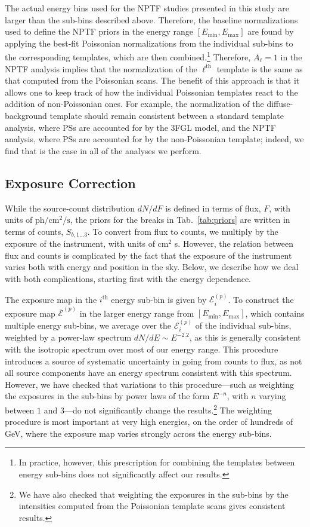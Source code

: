 The actual energy bins used for the NPTF studies presented in this study are larger than the sub-bins described above.  Therefore, the baseline normalizations used to define the NPTF priors in the energy range $[E_\text{min}, E_\text{max}]$ are found by applying the best-fit Poissonian normalizations from the individual sub-bins to the corresponding templates, which are then combined.\footnote{In practice, however, this prescription for combining the templates between energy sub-bins does not significantly affect our results.  
}
  Therefore, $A_\ell = 1$ in the NPTF analysis implies that the normalization of the $\ell^\text{th}$ template is the same as that computed from the Poissonian scans.  The benefit of this approach is that it allows one to keep track of how the individual Poissonian templates react to the addition of non-Poissonian ones.  For example, the normalization of the diffuse-background template should remain consistent between a standard template analysis, where PSs are accounted for by the 3FGL model, and the NPTF analysis, where PSs are accounted for by the non-Poissonian template; indeed, we find that is the case in all of the analyses we perform. 
  
\subsection{Exposure Correction}  
  
While the source-count distribution $dN/dF$ is defined in terms of flux, $F$, with units of $\text{ph}/\text{cm}^2/\text{s}$, the priors for the breaks in Tab.~\ref{tab:priors} are written in terms of counts, $S_{b,1...3}$.  To convert from flux to counts, we multiply by the exposure of the instrument, with units of cm$^2$ s.  However, the relation between flux and counts is complicated by the fact that the exposure of the instrument varies both with energy and position in the sky. Below, we describe how we deal with both complications, starting first with the energy dependence.  
  
The exposure map in the $i^\text{th}$ energy sub-bin is given by $\mathcal{E}^{(p)}_i$.  To construct the exposure map $\overbar{ \mathcal{E}}^{(p)}$ in the larger energy range from $[E_\text{min}, E_\text{max}]$, which contains multiple energy sub-bins, we average over the $\mathcal{E}^{(p)}_i$ of the individual sub-bins, weighted by a power-law spectrum $dN/dE \sim E^{-2.2}$, as this is generally consistent with the isotropic spectrum over most of our energy range.   
This procedure introduces a source of systematic uncertainty in going from counts to flux, as not all source components have an energy spectrum consistent with this spectrum.  However, we have checked that variations to this procedure---such as weighting the exposures in the sub-bins by power laws of the form $E^{-n}$, with $n$ varying between $1$ and $3$---do not significantly change the results.\footnote{We have also checked that weighting the exposures in the sub-bins by the intensities  computed from the Poissonian template scans gives consistent results.}   The weighting procedure is most important at very high energies, on the order of hundreds of GeV, where the exposure map varies strongly across the energy sub-bins.   
 

